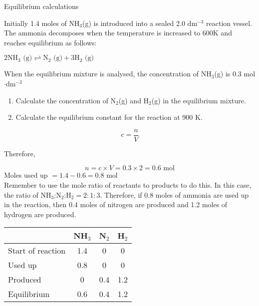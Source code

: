 \begin{wex}{Equilibrium calculations}{Initially 1.4 moles of NH$_{3}$(g) is introduced into a sealed 2.0 dm$^{-3}$ reaction vessel. The ammonia decomposes when the temperature is increased to 600K and reaches equilibrium as follows:

\begin{center}
$2\text{NH}_{3}\text{ (g)} \rightleftharpoons \text{N}_{2}\text{ (g)} + 3\text{H}_{2}\text{ (g)}$
\end{center}

When the equilibrium mixture is analysed, the concentration of NH$_{3}$(g) is 0.3 mol$\cdot$dm$^{-3}$

\begin{enumerate}
\item{Calculate the concentration of N$_{2}$(g) and H$_{2}$(g) in the equilibrium mixture.}
\item{Calculate the equilibrium constant for the reaction at 900 K.}
\end{enumerate}
}
{

\begin{equation*}
c = \frac{n}{V}
\end{equation*}

Therefore,

\begin{equation*}
n = c \times V = 0.3 \times 2 = 0.6 \text{ mol}
\end{equation*}
Moles used up $= 1.4 - 0.6 = 0.8$ mol\\
Remember to use the mole ratio of reactants to products to do this. In this case, the ratio of NH$_{3}$:N$_{2}$:H$_{2} = 2:1:3$. Therefore, if 0.8 moles of ammonia are used up in the reaction, then 0.4 moles of nitrogen are produced and 1.2 moles of hydrogen are produced.\\

\begin{center}
\begin{tabular}{|l|c|c|c|}\hline
 & \textbf{NH$_{3}$} & \textbf{N$_{2}$} & \textbf{H$_{2}$}\\\hline
Start of reaction & 1.4 & 0 & 0  \\\hline
Used up & 0.8 & 0 & 0  \\\hline
Produced & 0 & 0.4 & 1.2  \\\hline
Equilibrium & 0.6 & 0.4 & 1.2  \\\hline
\end{tabular}
\end{center}

}
\end{wex}
